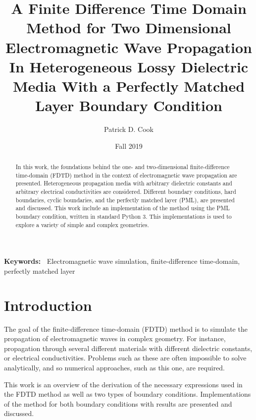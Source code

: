 \documentclass[12pt,twocolumn]{article}
\providecommand{\keywords}[1]{\textbf{\textbf{Keywords:~}} #1}
\begin{document}
\title{A Finite Difference Time Domain Method for Two Dimensional Electromagnetic Wave Propagation In Heterogeneous Lossy Dielectric Media With a Perfectly Matched Layer Boundary Condition}
\author{Patrick D. Cook}
\date{Fall 2019}
\begin{titlingpage}
\maketitle
\begin{abstract}
In this work, the foundations behind the one- and two-dimensional finite-difference time-domain (FDTD) method in the context of electromagnetic wave propagation are presented. Heterogeneous propagation media with arbitrary dielectric constants and arbitrary electrical conductivities are considered. Different boundary conditions, hard boundaries, cyclic boundaries, and the perfectly matched layer (PML), are presented and discussed. This work include an implementation of the method using the PML boundary condition, written in standard Python 3. This implementations is used to explore a variety of simple and complex geometries.
\end{abstract}

\keywords{Electromagnetic wave simulation, finite-difference time-domain, perfectly matched layer}
\end{titlingpage}
\newpage
\section{Introduction}
The goal of the finite-difference time-domain (FDTD) method is to simulate the propagation of electromagnetic waves in complex geometry. For instance, propagation through several different materials with different dielectric constants, or electrical conductivities. Problems such as these are often impossible to solve analytically, and so numerical approaches, such as this one, are required.

This work is an overview of the derivation of the necessary expressions used in the FDTD method as well as two types of boundary conditions. Implementations of the method for both boundary conditions with results are presented and discussed.
\end{document}
